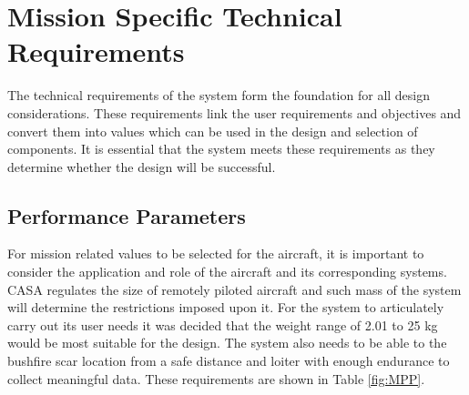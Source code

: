 \clearpage


\section{Mission Specific Technical Requirements}
The technical requirements of the system form the foundation for all design considerations. These requirements link the user requirements and objectives and convert them into values which can be used in the design and selection of components. It is essential that the system meets these requirements as they determine whether the design will be successful. 

% 

% 




\subsection{Performance Parameters}

For mission related values to be selected for the aircraft, it is important to consider the application and role of the aircraft and its corresponding systems. CASA regulates the size of remotely piloted aircraft and such mass of the system will determine the restrictions imposed upon it. For the system to articulately carry out its user needs it was decided that the weight range of 2.01 to 25 kg would be most suitable for the design. The system also needs to be able to the bushfire scar location from a safe distance and loiter with enough endurance to collect meaningful data. These requirements are shown in Table \ref{fig:MPP}.

